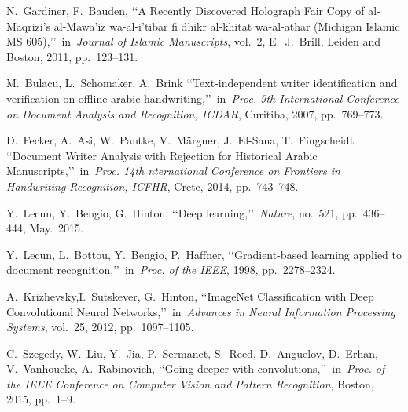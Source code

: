 \documentclass[conference,a4paper,twocolumn]{IEEEtran}
\begin{document}

%
%
%

\begin{thebibliography}{99}

 N.~Gardiner, F.~Bauden, \lq\lq A Recently Discovered Holograph Fair Copy of al-Maqrizi's al-Mawa'iz wa-al-i'tibar fi dhikr al-khitat wa-al-athar (Michigan Islamic MS 605),\rq\rq~in~\emph{Journal of Islamic Manuscripts}, vol.~2, E.~J.~Brill, Leiden and Boston, 2011, pp.~123--131.

 M.~Bulacu, L.~Schomaker, A.~Brink \lq\lq Text-independent writer identification and verification on offline arabic handwriting,\rq\rq~in~\emph{Proc. 9th International Conference on Document Analysis and Recognition, ICDAR}, Curitiba, 2007, pp.~769--773.

 D.~Fecker, A.~Asi, W.~Pantke, V.~Märgner, J.~El-Sana, T.~Fingscheidt \lq\lq Document Writer Analysis with Rejection for Historical Arabic Manuscripts,\rq\rq~in~\emph{Proc. 14th nternational Conference on Frontiers in Handwriting Recognition, ICFHR}, Crete, 2014, pp.~743--748.

 Y.~Lecun, Y.~Bengio, G.~Hinton, \lq\lq Deep learning,\rq\rq~\emph{Nature}, no.~521, pp.~436--444, May.~2015.

 Y.~Lecun, L.~Bottou, Y.~Bengio, P.~Haffner, \lq\lq Gradient-based learning applied to document recognition,\rq\rq~in~\emph{Proc. of the IEEE}, 1998, pp.~2278--2324.

 A.~Krizhevsky,I.~Sutskever, G.~Hinton, \lq\lq ImageNet Classification with Deep Convolutional Neural Networks,\rq\rq~in~\emph{Advances in Neural Information Processing Systems}, vol.~25, 2012, pp.~1097--1105.

 C.~Szegedy, W.~Liu, Y.~Jia, P.~Sermanet, S.~Reed, D.~Anguelov, D.~Erhan, V.~Vanhoucke, A.~Rabinovich, \lq\lq Going deeper with convolutions,\rq\rq~in~\emph{Proc. of the IEEE Conference on Computer Vision and Pattern Recognition}, Boston, 2015, pp.~1--9.


\end{thebibliography}
\end{document}
